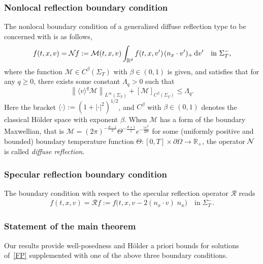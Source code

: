 \documentclass[AHL,Unicode,longabstracts,published]{cedram}
\newcommand*{\dif}{\mathop{}\!\mathrm{d}}
\newcommand*\p{\partial}
\newcommand*\R {\mathbb{R}}
\newcommand*\M {{\mathcal{M}}}
\newcommand*\NN {{\mathcal{N}\hspace{-.3mm}}}
\newcommand*\RR {\mathcal{R}}
\newcommand{\la}{\langle}
\newcommand{\ra}{\rangle}
\newcommand{\lv}{\langle v\rangle}
\begin{document}
\subsubsection{Nonlocal reflection boundary condition} 
The nonlocal boundary condition of a generalized diffuse reflection type to be concerned with is as follows,
\begin{align*}
f(t,x,v)=\NN f:=\M(t,x,v)\int_{\R^d}f(t,x,v')\;\!(n_x\cdot v')_+\dif v' {\quad\rm in\ }\Sigma_T^-,
\end{align*}
where the function $\M\in C^\beta(\Sigma_T)$ with $\beta\in(0,1)$ is given, and satisfies that for any $q\ge0$, there exists some constant $\Lambda_q>0$ such that
\begin{equation}\label{M}
\left\|\lv^q\M\right\|_{L^\infty(\Sigma_T)} + [\M]_{C^\beta(\Sigma_T)}\le\Lambda_q.
\end{equation}
Here the bracket $\la\cdot\ra:=(1+|\cdot|^2)^{1/2}$, and $C^\beta$ with $\beta\in(0,1)$ denotes the classical H\"older space with exponent $\beta$. When $\M$ has a form of the boundary Maxwellian, that is $\M=(2\pi)^{-\frac{d-1}{2}} \Theta^{-\frac{d+1}{2}} e^{-\frac{|v|^2}{2\Theta}}$ for some (uniformly positive and bounded) boundary temperature function $\Theta:[0,T]\times\p\Omega\rightarrow\R_+$, the operator $\NN$ is called \emph{diffuse reflection}.

\subsubsection{Specular reflection boundary condition} 

The boundary condition with respect to the specular reflection operator $\RR$ reads
\begin{align*}
f(t,x,v)=\RR f:=f\big(t,x,v-2(n_x\cdot v)\;\!n_x\big) \quad\text{in}\;\Sigma_T^-.
\end{align*}

\subsubsection{Statement of the main theorem} 

Our results provide well-posedness and H\"older a priori bounds for solutions of~\eqref{FP} supplemented with one of the above three boundary conditions.
\end{document}
